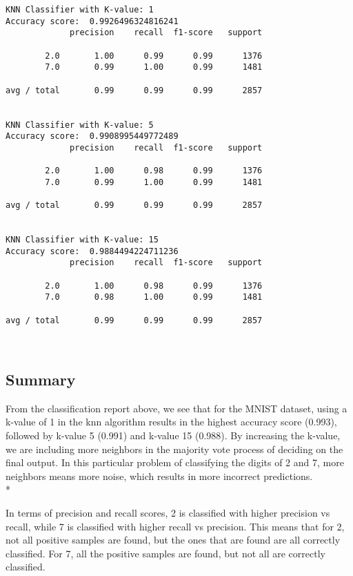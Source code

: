\documentclass[11pt]{article}
\def\br{\hspace*{\fill} \\* }
\begin{document}
    \begin{Verbatim}[commandchars=\\\{\},fontsize=\footnotesize]
KNN Classifier with K-value: 1
Accuracy score:  0.9926496324816241
             precision    recall  f1-score   support

        2.0       1.00      0.99      0.99      1376
        7.0       0.99      1.00      0.99      1481

avg / total       0.99      0.99      0.99      2857


KNN Classifier with K-value: 5
Accuracy score:  0.9908995449772489
             precision    recall  f1-score   support

        2.0       1.00      0.98      0.99      1376
        7.0       0.99      1.00      0.99      1481

avg / total       0.99      0.99      0.99      2857


KNN Classifier with K-value: 15
Accuracy score:  0.9884494224711236
             precision    recall  f1-score   support

        2.0       1.00      0.98      0.99      1376
        7.0       0.98      1.00      0.99      1481

avg / total       0.99      0.99      0.99      2857



    \end{Verbatim}

    \subsection*{Summary}

From the classification report above, we see that for the MNIST dataset,
using a k-value of 1 in the knn algorithm results in the highest
accuracy score (0.993), followed by k-value 5 (0.991) and k-value 15
(0.988). By increasing the k-value, we are including more neighbors in
the majority vote process of deciding on the final output. In this
particular problem of classifying the digits of 2 and 7, more neighbors
means more noise, which results in more incorrect predictions.\br

In terms of precision and recall scores, 2 is classified with higher
precision vs recall, while 7 is classified with higher recall vs
precision. This means that for 2, not all positive samples are found,
but the ones that are found are all correctly classified. For 7, all the
positive samples are found, but not all are correctly classified.
\end{document}
